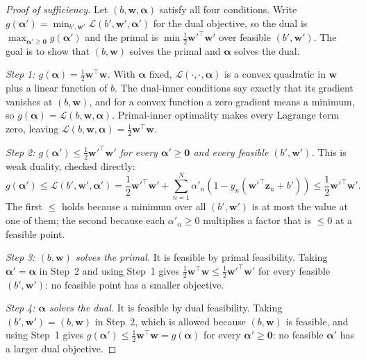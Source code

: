 \begin{proof}[Proof of sufficiency]
    Let \((b, \bm{w}, \bm{\alpha})\) satisfy all four conditions. Write
    \(g(\bm{\alpha}') = \min_{b', \bm{w}'} \mathcal{L}(b', \bm{w}',
    \bm{\alpha}')\) for the dual objective, so the dual is \(\max_{\bm{\alpha}'
    \ge \bm{0}} g(\bm{\alpha}')\) and the primal is \(\min \frac{1}{2}
    \bm{w}'^\top \bm{w}'\) over feasible \((b', \bm{w}')\). The goal is to
    show that \((b, \bm{w})\) solves the primal and \(\bm{\alpha}\) solves
    the dual.

    \emph{Step 1: \(g(\bm{\alpha}) = \frac{1}{2} \bm{w}^\top \bm{w}\).}
    With \(\bm{\alpha}\) fixed, \(\mathcal{L}(\cdot, \cdot, \bm{\alpha})\) is
    a convex quadratic in \(\bm{w}\) plus a linear function of \(b\). The
    dual-inner conditions say exactly that its gradient vanishes at \((b,
    \bm{w})\), and for a convex function a zero gradient means a minimum, so
    \(g(\bm{\alpha}) = \mathcal{L}(b, \bm{w}, \bm{\alpha})\). Primal-inner
    optimality makes every Lagrange term zero, leaving
    \(\mathcal{L}(b, \bm{w}, \bm{\alpha}) = \frac{1}{2} \bm{w}^\top \bm{w}\).

    \emph{Step 2: \(g(\bm{\alpha}') \le \frac{1}{2} \bm{w}'^\top \bm{w}'\)
    for every \(\bm{\alpha}' \ge \bm{0}\) and every feasible \((b',
    \bm{w}')\).} This is weak duality, checked directly:
    \[
        g(\bm{\alpha}') \le \mathcal{L}(b', \bm{w}', \bm{\alpha}')
        = \frac{1}{2} \bm{w}'^\top \bm{w}' + \sum_{n=1}^N \alpha'_n \left(
        1 - y_n (\bm{w}'^\top \bm{z}_n + b') \right)
        \le \frac{1}{2} \bm{w}'^\top \bm{w}'.
    \]
    The first \(\le\) holds because a minimum over all \((b', \bm{w}')\) is
    at most the value at one of them; the second because each \(\alpha'_n
    \ge 0\) multiplies a factor that is \(\le 0\) at a feasible point.

    \emph{Step 3: \((b, \bm{w})\) solves the primal.} It is feasible by
    primal feasibility. Taking \(\bm{\alpha}' = \bm{\alpha}\) in Step~2 and
    using Step~1 gives \(\frac{1}{2} \bm{w}^\top \bm{w} \le \frac{1}{2}
    \bm{w}'^\top \bm{w}'\) for every feasible \((b', \bm{w}')\): no feasible
    point has a smaller objective.

    \emph{Step 4: \(\bm{\alpha}\) solves the dual.} It is feasible by dual
    feasibility. Taking \((b', \bm{w}') = (b, \bm{w})\) in Step~2, which is
    allowed because \((b, \bm{w})\) is feasible, and using Step~1 gives
    \(g(\bm{\alpha}') \le \frac{1}{2} \bm{w}^\top \bm{w} = g(\bm{\alpha})\)
    for every \(\bm{\alpha}' \ge \bm{0}\): no feasible \(\bm{\alpha}'\) has a
    larger dual objective.
\end{proof}

